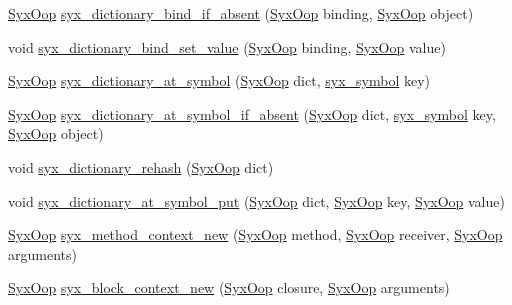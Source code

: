 \begin{CompactItemize}
\hyperlink{syx-types_8h_1121caba2d40b2ce090b640762744ccd}{SyxOop} \hyperlink{syx-object_8c_848c7464a13faa61d5fa8bb8f8a99688}{syx\_\-dictionary\_\-bind\_\-if\_\-absent} (\hyperlink{syx-types_8h_1121caba2d40b2ce090b640762744ccd}{SyxOop} binding, \hyperlink{syx-types_8h_1121caba2d40b2ce090b640762744ccd}{SyxOop} object)
\item 
void \hyperlink{syx-object_8c_b780a6826d077c055fc6714972723709}{syx\_\-dictionary\_\-bind\_\-set\_\-value} (\hyperlink{syx-types_8h_1121caba2d40b2ce090b640762744ccd}{SyxOop} binding, \hyperlink{syx-types_8h_1121caba2d40b2ce090b640762744ccd}{SyxOop} value)
\item 
\hyperlink{syx-types_8h_1121caba2d40b2ce090b640762744ccd}{SyxOop} \hyperlink{syx-object_8c_d21c4f116141ae2ac9d43ca94c902f90}{syx\_\-dictionary\_\-at\_\-symbol} (\hyperlink{syx-types_8h_1121caba2d40b2ce090b640762744ccd}{SyxOop} dict, \hyperlink{syx-types_8h_9663af54b7b72f5d8be5f754ef356525}{syx\_\-symbol} key)
\item 
\hyperlink{syx-types_8h_1121caba2d40b2ce090b640762744ccd}{SyxOop} \hyperlink{syx-object_8c_df9287e8b1edc74ddd6a66b9c8f2118e}{syx\_\-dictionary\_\-at\_\-symbol\_\-if\_\-absent} (\hyperlink{syx-types_8h_1121caba2d40b2ce090b640762744ccd}{SyxOop} dict, \hyperlink{syx-types_8h_9663af54b7b72f5d8be5f754ef356525}{syx\_\-symbol} key, \hyperlink{syx-types_8h_1121caba2d40b2ce090b640762744ccd}{SyxOop} object)
\item 
void \hyperlink{syx-object_8c_1517818caf6e5acff8ac8b23b1ff9294}{syx\_\-dictionary\_\-rehash} (\hyperlink{syx-types_8h_1121caba2d40b2ce090b640762744ccd}{SyxOop} dict)
\item 
void \hyperlink{syx-object_8c_85b96f493bbd81bea0f40968a3972e80}{syx\_\-dictionary\_\-at\_\-symbol\_\-put} (\hyperlink{syx-types_8h_1121caba2d40b2ce090b640762744ccd}{SyxOop} dict, \hyperlink{syx-types_8h_1121caba2d40b2ce090b640762744ccd}{SyxOop} key, \hyperlink{syx-types_8h_1121caba2d40b2ce090b640762744ccd}{SyxOop} value)
\item 
\hyperlink{syx-types_8h_1121caba2d40b2ce090b640762744ccd}{SyxOop} \hyperlink{syx-object_8c_d27128de6c8566b5bc0c667c8bf4c5b0}{syx\_\-method\_\-context\_\-new} (\hyperlink{syx-types_8h_1121caba2d40b2ce090b640762744ccd}{SyxOop} method, \hyperlink{syx-types_8h_1121caba2d40b2ce090b640762744ccd}{SyxOop} receiver, \hyperlink{syx-types_8h_1121caba2d40b2ce090b640762744ccd}{SyxOop} arguments)
\item 
\hyperlink{syx-types_8h_1121caba2d40b2ce090b640762744ccd}{SyxOop} \hyperlink{syx-object_8c_5b0e62ae669fb1a068cba533885c48d3}{syx\_\-block\_\-context\_\-new} (\hyperlink{syx-types_8h_1121caba2d40b2ce090b640762744ccd}{SyxOop} closure, \hyperlink{syx-types_8h_1121caba2d40b2ce090b640762744ccd}{SyxOop} arguments)

\end{CompactItemize}
